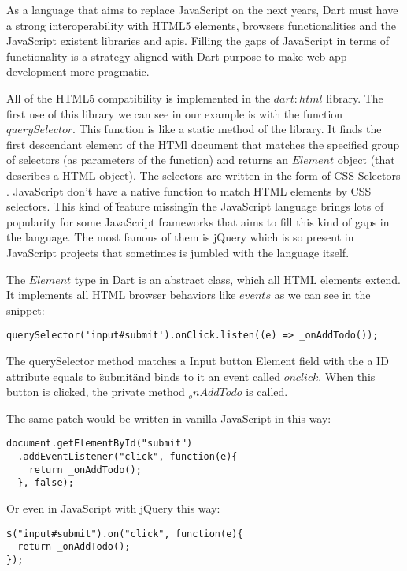 As a language that aims to replace JavaScript on the next years, Dart must have
a strong interoperability with HTML5 elements, browsers functionalities and the
JavaScript existent libraries and apis. Filling the gaps of JavaScript in terms
of functionality is a strategy aligned with Dart purpose to make web app
development more pragmatic.

All of the HTML5 compatibility is implemented in the $dart:html$ library. The
first use of this library we can see in our example is with the function
$querySelector$. This function is like a static method of the library. It finds
the first descendant element of the HTMl document that matches the specified
group of selectors (as parameters of the function) and returns an $Element$
object (that describes a HTML object). The selectors are written in the
form of CSS Selectors \cite{4_7}. JavaScript don't
have a native function to match HTML elements by CSS selectors. This kind of
\"feature missing\" in the JavaScript language brings lots of popularity for some
JavaScript frameworks that aims to fill this kind of gaps in the language. The
most famous of them is jQuery \cite{4_8}
which is so present in JavaScript projects that sometimes is jumbled with the
language itself.

The $Element$ type in Dart \cite{4_9} is an
abstract class, which all HTML elements extend. It implements all HTML browser
behaviors like $events$ as we can see in the snippet:

\begin{verbatim}
querySelector('input#submit').onClick.listen((e) => _onAddTodo());  
\end{verbatim}

The querySelector method matches a Input button Element field with the a ID
attribute equals to \"submit\" and binds to it an event called $onclick$. When
this button is clicked, the private method $_onAddTodo$ is called.

The same patch would be written in vanilla JavaScript in this way:

\begin{lstlisting}[label=jset,caption=Vanilla JavaScript translation]
document.getElementById("submit")
  .addEventListener("click", function(e){
    return _onAddTodo();
  }, false);
\end{lstlisting}

Or even in JavaScript with jQuery this way:

\begin{lstlisting}[label=jjqt,caption=JavaScript with jQuery translation]
$("input#submit").on("click", function(e){
  return _onAddTodo();
});
\end{lstlisting}

